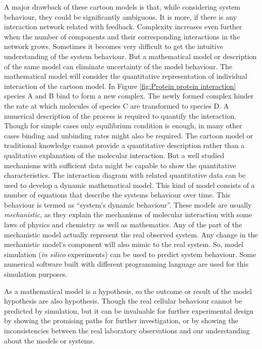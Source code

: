 A major drawback of these cartoon models is that, while considering system behaviour, they could be significantly ambiguous. It is more, if there is any interaction network related with feedback. Complexity increases even further when the number of components and their corresponding interactions in the network grows. Sometimes it becomes very difficult to get the intuitive understanding of the system behaviour. But a mathematical model or description of the same model can eliminate uncertainty of the model behaviour. The mathematical model will consider the quantitative representation of individual interaction of the cartoon model. In Figure \ref{fig:Protein protein interaction} species A and B bind to form a new complex. The newly formed complex hinder the rate at which molecules of species C are transformed to species D. A numerical description of the process is required to quantify the interaction. Though for simple cases only equilibrium condition is enough, in many other cases binding and unbinding rates might also be required. The cartoon model or traditional knowledge cannot provide a quantitative description rather than a qualitative explanation of the molecular interaction. But a well studied mechanisms with sufficient data might be capable to show the quantitative characteristics. The interaction diagram with related quantitative data can be used to develop a dynamic mathematical model. This kind of model consists of a number of equations that describe the systems behaviour over time. This behaviour is termed as ``system's dynamic behaviour''. These models are usually \textit{mechanistic}, as they explain the mechanisms of molecular interaction with some laws of physics and chemistry as well as mathematics. Any of the part of the mechanistic model actually represent the real observed system. Any change in the mechanistic model's component will also mimic to the real system. So, model simulation (\textit{in silico} experiments) can be used to predict system behaviour. Some numerical software built with different programming language are used for this simulation purposes. 

As a mathematical model is a hypothesis, so the outcome or result of the model hypothesis are also hypothesis. Though the real cellular behaviour cannot be predicted by simulation, but it can be invaluable for further experimental design by showing the promising paths for further investigation, or by showing the inconsistencies between the real laboratory observations and our understanding about the models or systems. 

